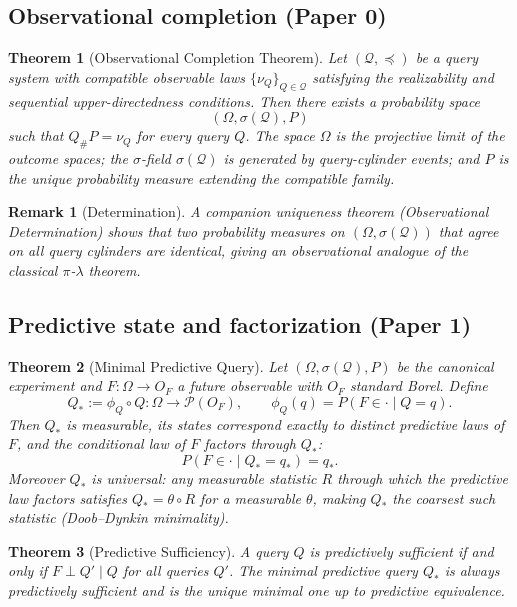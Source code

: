 \documentclass[11pt]{article}
\newtheorem{theorem}{Theorem}
\newtheorem{remark}{Remark}
\begin{document}
\subsection{Observational completion \textnormal{(Paper 0)}}

\begin{theorem}[Observational Completion Theorem]
Let $(\mathcal Q,\preceq)$ be a query system with compatible observable
laws $\{\nu_Q\}_{Q\in\mathcal Q}$ satisfying the realizability and
sequential upper-directedness conditions.  Then there exists a
probability space
\[
(\Omega,\sigma(\mathcal Q),P)
\]
such that $Q_\#P=\nu_Q$ for every query $Q$.  The space $\Omega$ is the
projective limit of the outcome spaces; the $\sigma$-field
$\sigma(\mathcal Q)$ is generated by query-cylinder events; and $P$ is
the unique probability measure extending the compatible family.
\end{theorem}

\begin{remark}[Determination]
A companion uniqueness theorem (Observational Determination) shows that
two probability measures on $(\Omega,\sigma(\mathcal Q))$ that agree on
all query cylinders are identical, giving an observational analogue of
the classical $\pi$-$\lambda$ theorem.
\end{remark}

\subsection{Predictive state and factorization \textnormal{(Paper 1)}}

\begin{theorem}[Minimal Predictive Query]
Let $(\Omega,\sigma(\mathcal Q),P)$ be the canonical experiment and
$F:\Omega\to O_F$ a future observable with $O_F$ standard Borel.
Define
\[
Q_* := \phi_Q \circ Q : \Omega \to \mathcal P(O_F),
\qquad
\phi_Q(q) = P(F\in\cdot\mid Q=q).
\]
Then $Q_*$ is measurable, its states correspond exactly to distinct
predictive laws of $F$, and the conditional law of $F$ factors through
$Q_*$:
\[
P(F\in\cdot\mid Q_*=q_*) = q_*.
\]
Moreover $Q_*$ is universal: any measurable statistic $R$ through which
the predictive law factors satisfies $Q_* = \theta\circ R$ for a
measurable $\theta$, making $Q_*$ the coarsest such statistic
(Doob--Dynkin minimality).
\end{theorem}

\begin{theorem}[Predictive Sufficiency]
A query $Q$ is predictively sufficient if and only if
$F \perp Q' \mid Q$ for all queries $Q'$.  The minimal predictive
query $Q_*$ is always predictively sufficient and is the unique minimal
one up to predictive equivalence.
\end{theorem}
\end{document}
